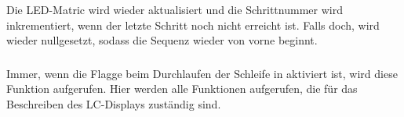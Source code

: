 Die LED-Matric wird wieder aktualisiert und die Schrittnummer wird inkrementiert, wenn der letzte Schritt noch nicht erreicht ist. Falls doch, wird  wieder nullgesetzt, sodass die Sequenz wieder von vorne beginnt.

\subsubsection{} %
\label{ssub:void_update_display}
Immer, wenn die Flagge  beim Durchlaufen der Schleife in  aktiviert ist, wird diese Funktion aufgerufen. Hier werden alle Funktionen aufgerufen, die für das Beschreiben des LC-Displays zuständig sind.
